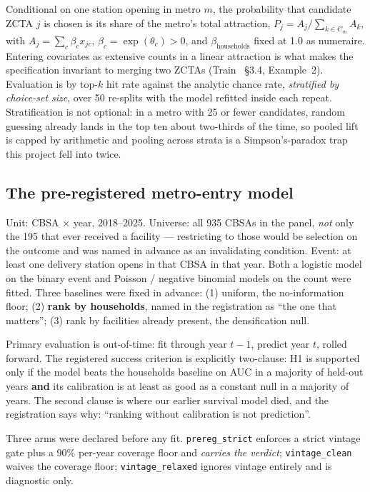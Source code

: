 \documentclass[conference]{IEEEtran}
\begin{document}
Conditional on one station opening in metro $m$, the probability that
candidate ZCTA $j$ is chosen is its share of the metro's total attraction,
$P_j = A_j / \sum_{k \in C_m} A_k$, with $A_j = \sum_c \beta_c x_{jc}$,
$\beta_c = \exp(\theta_c) > 0$, and $\beta_{\mathrm{households}}$ fixed at
1.0 as numeraire. Entering covariates as extensive counts in a linear
attraction is what makes the specification invariant to merging two ZCTAs
(Train~\cite{train2009} \S3.4, Example~2). Evaluation is by top-$k$ hit rate
against the analytic chance rate, \emph{stratified by choice-set size}, over
50 re-splits with the model refitted inside each repeat. Stratification is not
optional: in a metro with 25 or fewer candidates, random guessing already lands
in the top ten about two-thirds of the time, so pooled lift is capped by
arithmetic and pooling across strata is a Simpson's-paradox trap this project
fell into twice.

\subsection{The pre-registered metro-entry model}

Unit: CBSA $\times$ year, 2018--2025. Universe: all 935 CBSAs in the panel,
\emph{not} only the 195 that ever received a facility --- restricting to those
would be selection on the outcome and was named in advance as an invalidating
condition. Event: at least one delivery station opens in that CBSA in that
year. Both a logistic model on the binary event and Poisson / negative binomial
models on the count were fitted. Three baselines were fixed in advance:
(1) uniform, the no-information floor; (2) \textbf{rank by households}, named
in the registration as ``the one that matters''; (3) rank by facilities already
present, the densification null.

Primary evaluation is out-of-time: fit through year $t-1$, predict year $t$,
rolled forward. The registered success criterion is explicitly two-clause:
H1 is supported only if the model beats the households baseline on AUC in a
majority of held-out years \textbf{and} its calibration is at least as good as
a constant null in a majority of years. The second clause is where our earlier
survival model died, and the registration says why: ``ranking without
calibration is not prediction''.

Three arms were declared before any fit. \texttt{prereg\_strict} enforces a
strict vintage gate plus a 90\% per-year coverage floor and \emph{carries the
verdict}; \texttt{vintage\_clean} waives the coverage floor;
\texttt{vintage\_relaxed} ignores vintage entirely and is diagnostic only.
\end{document}
